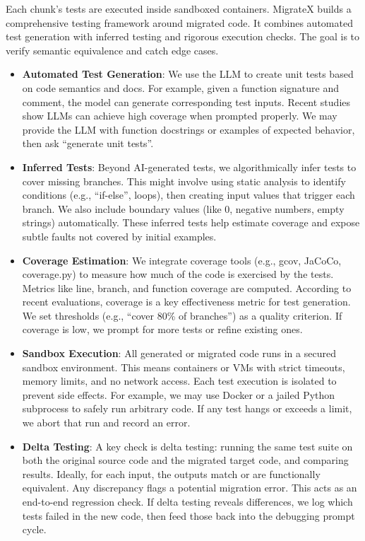 \documentclass[twocolumn]{article}
\begin{document}
Each chunk’s tests are executed inside sandboxed containers.
MigrateX builds a comprehensive testing framework around migrated code. It combines automated test generation with inferred testing and rigorous execution checks. The goal is to verify semantic equivalence and catch edge cases.

\begin{itemize}
    \item \textbf{Automated Test Generation}: We use the LLM to create unit tests based on code semantics and docs. For example, given a function signature and comment, the model can generate corresponding test inputs. Recent studies show LLMs can achieve high coverage when prompted properly. We may provide the LLM with function docstrings or examples of expected behavior, then ask ``generate unit tests''.

    \item \textbf{Inferred Tests}: Beyond AI-generated tests, we algorithmically infer tests to cover missing branches. This might involve using static analysis to identify conditions (e.g., ``if-else'', loops), then creating input values that trigger each branch. We also include boundary values (like 0, negative numbers, empty strings) automatically. These inferred tests help estimate coverage and expose subtle faults not covered by initial examples.

    \item \textbf{Coverage Estimation}: We integrate coverage tools (e.g., gcov, JaCoCo, coverage.py) to measure how much of the code is exercised by the tests. Metrics like line, branch, and function coverage are computed. According to recent evaluations, coverage is a key effectiveness metric for test generation. We set thresholds (e.g., ``cover 80\% of branches'') as a quality criterion. If coverage is low, we prompt for more tests or refine existing ones.

    \item \textbf{Sandbox Execution}: All generated or migrated code runs in a secured sandbox environment. This means containers or VMs with strict timeouts, memory limits, and no network access. Each test execution is isolated to prevent side effects. For example, we may use Docker or a jailed Python subprocess to safely run arbitrary code. If any test hangs or exceeds a limit, we abort that run and record an error.

    \item \textbf{Delta Testing}: A key check is delta testing: running the same test suite on both the original source code and the migrated target code, and comparing results. Ideally, for each input, the outputs match or are functionally equivalent. Any discrepancy flags a potential migration error. This acts as an end-to-end regression check. If delta testing reveals differences, we log which tests failed in the new code, then feed those back into the debugging prompt cycle.


\end{itemize}
\end{document}
